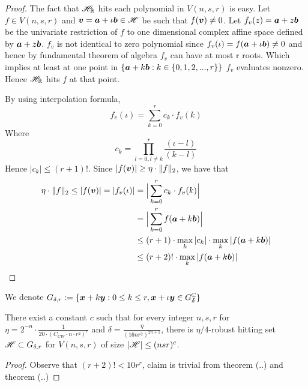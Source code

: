 {\begin{proof}
The fact that $\mathscr{H}_{\mathbb{R}}$ hits each polynomial in $V(n,s,r)$ is easy. Let $f\in V(n,s,r)$ and $\bm v = \bm a+\iota \bm b \in \mathscr{H}$ be such that $f(\bm v)\ne 0$. Let $f_v(z) = \bm a+ z\bm b$ be the univariate restriction of $f$ to one dimensional complex affine space defined by $\bm a+z\bm b$. $f_v$ is not identical to zero polynomial since $f_v(\iota) = f(\bm a+\iota \bm b) \ne 0$ and hence by fundamental theorem of algebra $f_v$ can have at most r roots. Which implies at least at one point in $\{\bm a+k\bm b:k\in \{0,1,2,...,r\}\}$ $f_v$ evaluates nonzero. Hence $\mathscr{H}_{\mathbb{R}}$ hits $f$ at that point.

By using interpolation formula,
$$
f_v(\iota) = \sum_{k=0}^r c_k\cdot f_v(k)
$$
Where 
$$
c_k = \prod_{l=0,l\ne k}^{r}\frac{(\iota-l)}{(k-l)}
$$
Hence $|c_k| \le (r+1)!$. Since $|f(\bm v)| \ge \eta\cdot\|f\|_2$, we have that
\begin{align*}
\eta\cdot\|f\|_2 \le |f(\bm v)| = |f_v(\iota)|&= \Big|\sum_{k=0}^r c_k \cdot f_v(k)\Big| \\
&= \Big|\sum_{k=0}^r f(\bm a + k\bm b)\Big|\\
&\le (r+1)\cdot\max_k{|c_k|}\cdot\max_k{|f(\bm a+k\bm b)|}\\
&\le(r+2)!\cdot\max_k{|f(\bm a+k\bm b)|}
\end{align*} 
\end{proof}
We denote $G_{\delta,r} := \{\bm x+k\bm y: 0\le k \le r, \bm x+\iota \bm y \in G_\delta^{\mathbb{C}}\}$
\thmpara
\begin{corollary}
There exist a constant $c$ such that for every integer $n,s,r$ for $\eta = 2^{-n}\cdot\frac{1}{20\cdot(C_{CW}\cdot n \cdot r^2)^r}$ and $\delta = \frac{\eta}{(16nr^2)^{2n+1}}$, there is $\eta/4$-robust hitting set $\mathscr{H}\subset G_{\delta,r}$ for $V(n,s,r)$ of size $|\mathscr{H}| \le (nsr)^c$.
\end{corollary}
\begin{proof}
Observe that $(r+2)!<10r^r$, claim is trivial from theorem (..) and theorem (..)
\end{proof}
}